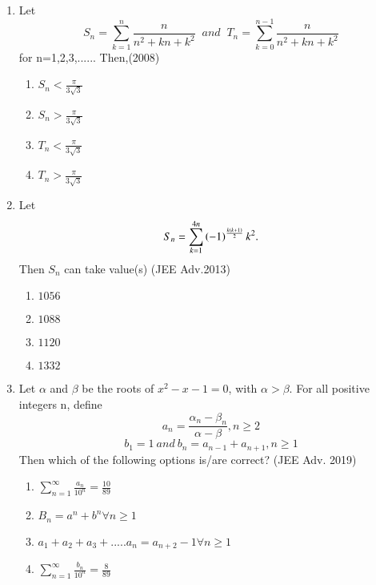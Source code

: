 \documentclass[journal,12pt,twocolumn]{IEEEtran}
\theoremstyle{remark}
\begin{document}
\begin{enumerate}
\item Let 
\begin{equation*}
S_n=\sum_{k=1}^{n}\frac{n}{n^2+kn+k^2} \;\; and \;\; T_n=\sum_{k=0}^{n-1}\frac{n}{n^2+kn+k^2}
\end{equation*}
for\;\; n=1,2,3,...... Then,\hfill{(2008)}
\begin{multicols}{2}
\begin{enumerate}
\item $S_n<\frac{\pi}{3\sqrt{3}}$
\item $S_n>\frac{\pi}{3\sqrt{3}}$
\item $T_n<\frac{\pi}{3\sqrt{3}}$
\item $T_n>\frac{\pi}{3\sqrt{3}}$
\end{enumerate}
\end{multicols}

\item Let \begin{equation*} S_n=\sum_{k=1}^{4n}\left(-1\right)^\frac{k\left(k+1\right)}{2}k^2.\end{equation*}  Then $S_n$ can take value(s)  \hfill{(JEE Adv.2013)}
\begin{multicols}{2}
\begin{enumerate}
\item $1056$
\item $1088$
\item $1120$
\item $1332$
\end{enumerate}
\end{multicols}

\item Let $\alpha$ and $\beta$ be the roots of $x^2-x-1=0$, with $\alpha>\beta$. For all positive integers n, define
\begin{equation*}
a_n=\frac{\alpha_n-\beta_n}{\alpha-\beta},n\geq2
\end{equation*}
\begin{equation*}
b_1=1 \: and \: b_n=a_{n-1}+a_{n+1},n\geq1
\end{equation*}
Then which of the following options is/are correct?
\hfill{(JEE Adv. 2019)}
\begin{enumerate}
\item $\sum_{n=1}^{\infty}\frac{a_n}{10^n}=\frac{10}{89}$
\item $B_n=a^n+b^n \forall n\geq1$
\item $a_1+a_2+a_3+.....a_n=a_{n+2}-1 \forall n\geq1$
\item $\sum_{n=1}^{\infty}\frac{b_n}{10^n}=\frac{8}{89}$
\end{enumerate}
\end{enumerate}
\end{document}
